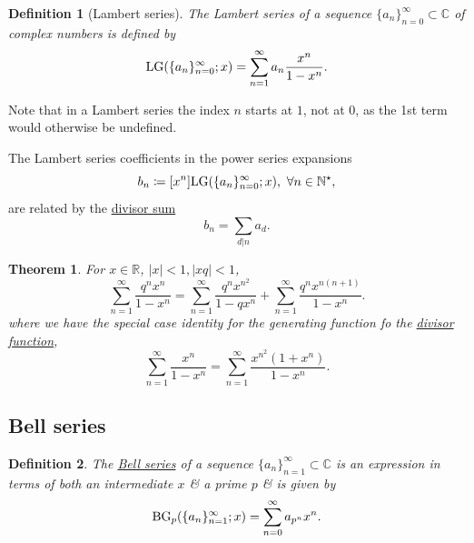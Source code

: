 \documentclass[oneside]{book}
\newtheorem{definition}{Definition}
\newtheorem{theorem}{Theorem}
\begin{document}
\begin{definition}[Lambert series]
	The {\rm Lambert series} of a sequence $\{a_n\}_{n=0}^\infty\subset\mathbb{C}$ of complex numbers is defined by
	\begin{equation}
		{\rm LG}(\{a_n\}_{n=0}^\infty;x) = \sum_{n=1}^\infty a_n\frac{x^n}{1 - x^n}.
	\end{equation}
\end{definition}
Note that in a Lambert series the index $n$ starts at $1$, not at 0, as the 1st term would otherwise be undefined.

The Lambert series coefficients in the power series expansions
\begin{equation*}
	b_n\coloneqq[x^n]{\rm LG}(\{a_n\}_{n=0}^\infty;x),\ \forall n\in\mathbb{N}^\star,
\end{equation*}
are related by the \href{https://en.wikipedia.org/wiki/Divisor_sum_identities}{divisor sum}
\begin{equation*}
	b_n = \sum_{d|n} a_d.
\end{equation*}

\begin{theorem}
	For $x\in\mathbb{R}$, $|x| < 1,|xq| < 1$,
	\begin{equation*}
		\sum_{n=1}^\infty \frac{q^nx^n}{1 - x^n} = \sum_{n=1}^\infty \frac{q^nx^{n^2}}{1 - qx^n} + \sum_{n=1}^\infty \frac{q^nx^{n(n+1)}}{1 - x^n}.
	\end{equation*}
	where we have the special case identity for the generating function fo the \href{https://en.wikipedia.org/wiki/Divisor_function}{divisor function},
	\begin{equation*}
		\sum_{n=1}^\infty \frac{x^n}{1 - x^n} = \sum_{n=1}^\infty \frac{x^{n^2}(1 + x^n)}{1 - x^n}.
	\end{equation*}
\end{theorem}


\subsection{Bell series}

\begin{definition}
	The \href{https://en.wikipedia.org/wiki/Bell_series}{Bell series} of a sequence $\{a_n\}_{n=1}^\infty\subset\mathbb{C}$ is an expression in terms of both an intermediate $x$ \& a prime $p$ \& is given by
	\begin{equation*}
		{\rm BG}_p(\{a_n\}_{n=1}^\infty;x) = \sum_{n=0}^\infty a_{p^n}x^n.
	\end{equation*}
\end{definition}
\end{document}
